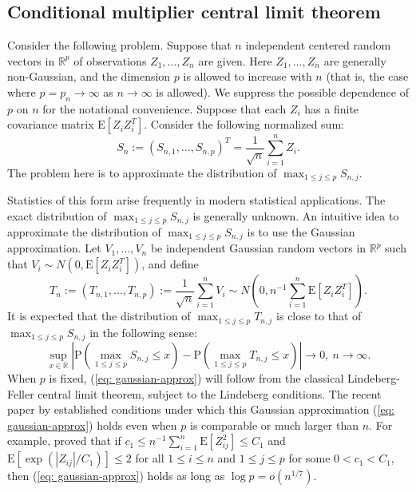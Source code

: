 \documentclass[11pt,reqno]{amsart}
\theoremstyle{definition}
\newcommand{\Ep}{{\mathrm{E}}}
\renewcommand{\Pr}{{\mathrm{P}}}
\newcommand{\RR}{\mathbb{R}}
\begin{document}
\subsection{Conditional multiplier central limit theorem}

Consider the following problem. Suppose that $n$ independent centered random vectors in $\RR^{p}$ of observations $Z_{1},\dots,Z_{n}$ are given. Here
$Z_{1},\dots,Z_{n}$ are generally non-Gaussian, and the dimension $p$ is allowed to increase with $n$ (that is, the case where $p=p_{n} \to \infty$ as $n \to \infty$ is allowed).
We suppress the possible dependence of $p$ on $n$ for the notational convenience.   Suppose that each $Z_{i}$ has a finite covariance matrix $\Ep [ Z_{i} Z_{i}^{T} ]$.
Consider the following normalized sum:
\begin{equation*}
S_{n} := (S_{n,1},\dots,S_{n,p})^{T} = \frac{1}{\sqrt{n}} \sum_{i=1}^{n} Z_{i}.
\end{equation*}
The problem here is to approximate the distribution of $\max_{1 \leq j \leq p} S_{n,j}$.

Statistics of this form arise frequently in modern statistical applications. The exact distribution of $\max_{1 \leq j \leq p} S_{n,j}$ is generally unknown.
An intuitive idea to approximate the distribution of $\max_{1 \leq j \leq p} S_{n,j}$ is to use the Gaussian approximation. Let $V_{1},\dots,V_{n}$ be independent Gaussian random vectors in $\RR^{p}$ such that $V_{i} \sim N(0,\Ep [ Z_{i} Z_{i}^{T} ])$, and define
\begin{equation*}
T_{n} := (T_{n,1},\dots,T_{n,p}) := \frac{1}{\sqrt{n}} \sum_{i=1}^{n} V_{i} \sim N(0,n^{-1} {\textstyle \sum}_{i=1}^{n} \Ep [Z_{i}Z_{i}^{T}] ).
\end{equation*}
It is expected that the distribution of $\max_{1 \leq j \leq p} T_{n,j}$ is close to that of $\max_{1 \leq j \leq p} S_{n,j}$ in the following sense:
\begin{equation}
 \sup_{x \in \RR} | \Pr ( \max_{1 \leq j \leq p} S_{n,j} \leq x ) - \Pr ( \max_{1 \leq j \leq p} T_{n,j} \leq x )   | \to 0, \ n \to \infty. \label{eq: gaussian-approx}
\end{equation}
When $p$ is fixed, (\ref{eq: gaussian-approx}) will follow from the classical Lindeberg-Feller central limit theorem, subject to the Lindeberg conditions. The recent paper by \cite{CCK12} established conditions under which this Gaussian approximation (\ref{eq: gaussian-approx}) holds even when $p$ is comparable or much larger than $n$.
For example, \cite{CCK12} proved that if $c_{1} \leq n^{-1} \sum_{i=1}^{n} \Ep [ Z_{ij}^{2} ] \leq C_{1}$ and $\Ep [ \exp (| Z_{ij} |/ C_{1} ) ] \leq 2$ for all $1 \leq i \leq n$ and $1 \leq j \leq p$ for some $0 < c_{1} < C_{1}$,
then (\ref{eq: gaussian-approx}) holds as long as $\log p = o(n^{1/7})$.
\end{document}
